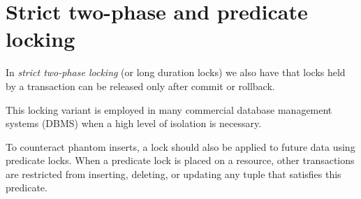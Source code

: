 \section{Strict two-phase and predicate locking}

\begin{definition}
    In \emph{strict two-phase locking} (or long duration locks) we also have that locks held by a transaction can be released only after commit or rollback.
\end{definition}
This locking variant is employed in many commercial database management systems (DBMS) when a high level of isolation is necessary.

To counteract phantom inserts, a lock should also be applied to future data using predicate locks. 
When a predicate lock is placed on a resource, other transactions are restricted from inserting, deleting, or updating any tuple that satisfies this predicate.